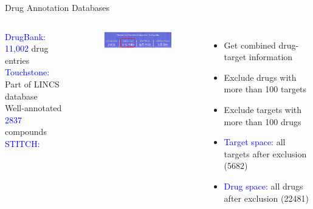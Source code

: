 \documentclass[10pt]{beamer}
\begin{document}
\begin{frame}{Drug Annotation Databases}
\vspace{0.3cm}
  \begin{columns}[T,onlytextwidth]
        \small
        \textcolor{blue}{DrugBank}: \textcolor{blue}{11,002} drug entries \\
        \vspace{0.1cm}
        \textcolor{blue}{Touchstone:} \\
        Part of LINCS database \\
        Well-annotated \textcolor{blue}{2837} compounds \\
        \vspace{0.1cm}
        \textcolor{blue}{STITCH:} 
        \vspace{-0.3cm}
        \begin{figure}
          \includegraphics[width=6cm]{demo/images/sti.png}
        \end{figure}
        \vspace{-0.5cm}
        \begin{itemize} \itemsep0pt
            \item Get combined drug-target information 
            \item Exclude drugs with more than 100 targets 
            \item Exclude targets with more than 100 drugs
            \item \textcolor{blue}{Target space:} all targets after exclusion (5682)
            \item \textcolor{blue}{Drug space:} all drugs after exclusion (22481)
        \end{itemize}


\end{columns}
\end{frame}
\end{document}
